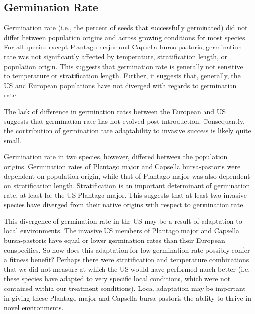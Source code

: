 \documentclass[12pt]{article}\usepackage[]{graphicx}\usepackage[]{color}
\begin{document}
	\subsection{Germination Rate} 
	
	
	Germination rate (i.e., the percent of seeds that successfully germinated) did not differ between population origins and across growing conditions for most species. For all species except Plantago major and Capsella bursa-pastoris, germination rate was not significantly affected by temperature, stratification length, or population origin. This suggests that germination rate is generally not sensitive to temperature or stratification length. Further, it suggests that, generally, the US and European populations have not diverged with regards to germination rate. 
	
	The lack of difference in germination rates between the European and US suggests that germination rate has not evolved post-introduction. Consequently, the contribution of germination rate adaptability to invasive success is likely quite small. 
	
	Germination rate in two species, however, differed between the population origins. Germination rates of Plantago major and Capsella bursa-pastoris were dependent on population origin, while that of Plantago major was also dependent on stratification length. Stratification is an important determinant of germination rate, at least for the US Plantago major. This suggests that at least two invasive species have diverged from their native origins with respect to germination rate. 
	
	This divergence of germination rate in the US may be a result of adaptation to local environments.  The invasive US members of Plantago major and Capsella bursa-pastoris have equal or lower germination rates than their European conspecifics. So how does this adaptation for low germination rate possibly confer a fitness benefit? Perhaps there were stratification and temperature combinations that we did not measure at which the US would have performed much better (i.e. these species have adapted to very specific local conditions, which were not contained within our treatment conditions). Local adaptation may be important in giving these Plantago major and Capsella bursa-pastoris the ability to thrive in novel environments.
	
\end{document}
